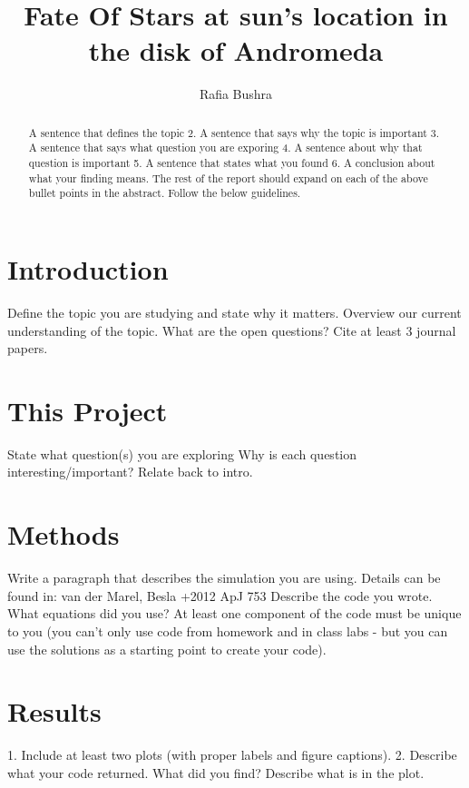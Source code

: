 \documentclass[iop]{emulateapj}
\begin{document}
\title{Fate Of Stars at sun's location in the disk of Andromeda}

\author{Rafia Bushra}

\begin{abstract}
    A sentence that defines the topic
    2. A sentence that says why the topic is important
    3. A sentence that says what question you are exporing 4. A sentence about why that question is important
    5. A sentence that states what you found
    6. A conclusion about what your finding means.
    The rest of the report should expand on each of the above bullet points in the abstract. Follow the below guidelines.
\end{abstract}

\section{Introduction}

    Define the topic you are studying and state why it matters. Overview our current understanding of the topic.
    What are the open questions?
    Cite at least 3 journal papers.

\section{This Project}

    State what question(s) you are exploring
    Why is each question interesting/important? Relate back to intro.


\section{Methods}

    Write a paragraph that describes the simulation you are using. Details can be found in: van der Marel, Besla +2012 ApJ 753
    Describe the code you wrote. What equations did you use? At least one component of the code must be unique to you (you can’t only use code from homework and in class labs - but you can use the solutions as a starting point to create your code).
    
\section{Results}
    
    1. Include at least two plots (with proper labels and figure captions). 
    2. Describe what your code returned. What did you find? Describe what is in the plot.
\end{document}
